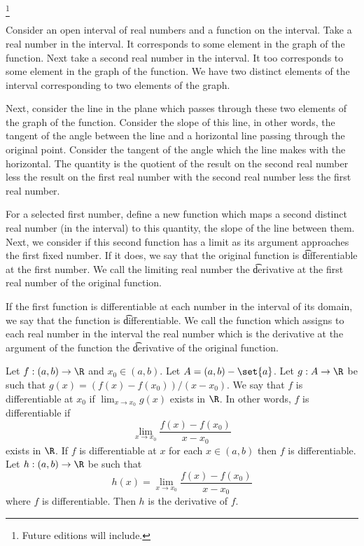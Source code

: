 
\footnote{Future editions will include.}


Consider an open interval of real numbers and a function on the interval.
Take a real number in the interval.  It corresponds to some element in the graph of the function.
Next take a second real number in the interval.
It too corresponds to some element in the graph of the function.
We have two distinct elements of the interval corresponding to two elements of the graph.

Next, consider the line in the plane which passes
through these two elements of the graph of the
function.
Consider the slope of this line, in other words,
the tangent of the angle between the line
and a horizontal line passing through the
original point.
Consider the tangent of the angle which the line
makes with the horizontal.
The quantity is the quotient
of the result on the second real number
less the result on the first real number
with the second real number less the first
real number.

For a selected first number,
define a new function which maps
a second distinct real number (in the interval)
to this quantity, the slope of the line
between them.
Next, we consider if this second function
has a limit as its argument approaches
the first fixed number.
If it does, we say that the original function is
\t{differentiable at} the first number.
We call the limiting real number the
\t{derivative at} the first real number of
the original function.

If the first function is differentiable at
each number in the interval of its domain,
we say that the function is \t{differentiable}.
We call the function which assigns to each
real number in the interval the real number
which is the derivative at the argument of
the function the \t{derivative of} the
original function.


Let $f: (a,b) \to \R$ and $x_0 \in (a, b)$.
Let $A = (a, b) - \set{a}$.
Let $g: A \to \R$ be such that
$g(x) = (f(x) - f(x_0))/(x - x_0)$.
We say that $f$ is differentiable at $x_0$ if
$\lim_{x \to x_0} g(x)$ exists in $\R$.
In other words, $f$ is differentiable if
\[
  \lim_{x \to x_0}
  \frac{f(x) - f(x_0)}{x - x_0}
\]
exists in $\R$.
If $f$ is differentiable at $x$ for each
$x \in (a, b)$ then $f$ is differentiable.
Let $h: (a,b) \to \R$ be such that
\[
  h(x) = \lim_{x \to x_0} \frac{f(x) - f(x_0)}{x - x_0}
\]
where $f$ is differentiable.  Then $h$ is the derivative of $f$.
